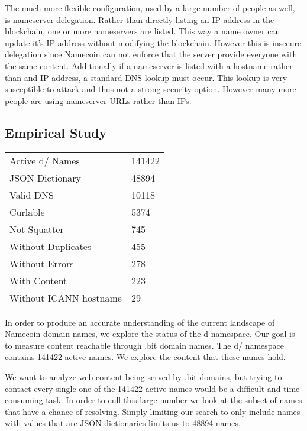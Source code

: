 The much more flexible configuration, used by a large number of people as well, is nameserver delegation. Rather than directly listing an IP address in the blockchain, one or more nameservers are listed. This way a name owner can update it's IP address without modifying the blockchain. However this is insecure delegation since Namecoin can not enforce that the server provide everyone with the same content. Additionally if a nameserver is listed with a hostname rather than and IP address, a standard DNS lookup must occur. This lookup is very susceptible to attack and thus not a strong security option. However many more people are using nameserver URLs rather than IPs.

\subsection{Empirical Study}

\begin{table}[t]
\begin{tabular}{ll}
Active d/ Names     & 141422  \\
JSON Dictionary      & 48894   \\
Valid DNS          & 10118  \\
Curlable        & 5374     \\
Not Squatter        & 745     \\
Without Duplicates      & 455     \\
Without Errors              & 278    \\
With Content              & 223    \\
Without ICANN hostname   & 29   \\
\end{tabular}
\end{table}

In order to produce an accurate understanding of the current landscape of Namecoin domain names, we explore the status of the d namespace. Our goal is to measure content reachable through .bit domain names. The d/ namespace contains 141422 active names. We explore the content that these names hold.

We want to analyze web content being served by .bit domains, but trying to contact every single one of the 141422 active names would be a difficult and time consuming task. In order to cull this large number we look at the subset of names that have a chance of resolving. Simply limiting our search to only include names with values that are JSON dictionaries limits us to 48894 names.

